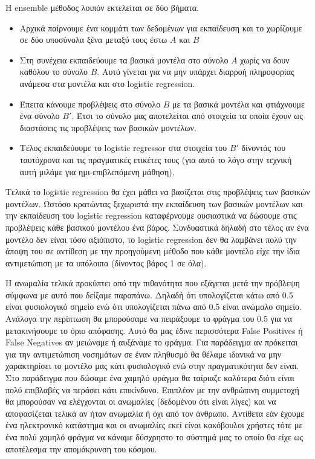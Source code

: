 \documentclass[a4paper,12pt]{report}
\theoremstyle{definitionNODot}
\begin{document}
	H ensemble μέθοδος λοιπόν εκτελείται σε δύο βήματα. 
	\begin{itemize}
		\item Αρχικά παίρνουμε ένα κομμάτι των δεδομένων για εκπαίδευση και το χωρίζουμε σε δύο υποσύνολα ξένα μεταξύ τους έστω $A$ και $B$
		\item Στη συνέχεια εκπαιδεύουμε τα βασικά μοντέλα στο σύνολο $A$ χωρίς να δουν καθόλου το σύνολο $B$. Αυτό γίνεται για να μην υπάρχει διαρροή πληροφορίας ανάμεσα στα μοντέλα και στο logistic regression.
		\item Έπειτα κάνουμε προβλέψεις στο σύνολο $B$ με τα βασικά μοντέλα και φτιάχνουμε ένα σύνολο $B'$. Έτσι το σύνολο μας αποτελείται από στοιχεία τα οποία έχουν ως διαστάσεις τις προβλέψεις των βασικών μοντέλων.
		\item Τέλος εκπαιδεύουμε το logistic regressor στα στοιχεία του $B'$ δίνοντάς του ταυτόχρονα και τις πραγματικές ετικέτες τους (για αυτό το λόγο στην τεχνική αυτή μιλάμε για ημι-επιβλεπόμενη μάθηση).
	\end{itemize}
	Τελικά το logistic regression θα έχει μάθει να βασίζεται στις προβλέψεις των βασικών μοντέλων. Ωστόσο κρατώντας ξεχωριστά την εκπαίδευση των βασικών μοντέλων και την εκπαίδευση του logistic regression καταφέρνουμε ουσιαστικά να δώσουμε στις προβλέψεις κάθε βασικού μοντέλου ένα βάρος. Συνδυαστικά δηλαδή στο τέλος αν ένα μοντέλο δεν είναι τόσο αξιόπιστο, το logistic regression δεν θα λαμβάνει πολύ την άποψη του σε αντίθεση με την προηγούμενη μέθοδο που κάθε μοντέλο είχε την ίδια αντιμετώπιση με τα υπόλοιπα (δίνοντας βάρος 1 σε όλα).
	
	Η ανωμαλία τελικά προκύπτει από την πιθανότητα που εξάγεται μετά την πρόβλεψη σύμφωνα με αυτό που δείξαμε παραπάνω. Δηλαδή ότι υπολογίζεται κάτω από 0.5 είναι φυσιολογικό σημείο ενώ ότι υπολογίζεται πάνω από 0.5 είναι ανώμαλο σημείο. Ανάλογα την περίπτωση θα μπορούσαμε να πειράξουμε το φράγμα του 0.5 για να μετακινήσουμε το όριο απόφασης. Αυτό θα μας έδινε περισσότερα False Positives ή False Negatives αν μειώναμε ή αυξάναμε το φράγμα. Για παράδειγμα αν πρόκειται για την αντιμετώπιση νοσημάτων σε έναν πληθυσμό θα θέλαμε ιδανικά να μην χαρακτηρίσει το μοντέλο μας κάτι φυσιολογικό ενώ στην πραγματικότητα δεν είναι. Στο παράδειγμα που δώσαμε ένα χαμηλό φράγμα θα ταίριαζε καλύτερα διότι είναι πολύ επιβλαβές να περάσει κάτι επικίνδυνο. Επιπλέον με την ανθρώπινη συμμετοχή θα μπορούσαν να ελέγχονται οι ανωμαλίες (δεδομένου ότι είναι λίγες) και να αποφασίζεται τελικά αν ήταν ανωμαλία ή όχι από τον άνθρωπο. Αντίθετα εάν έχουμε ένα ηλεκτρονικό κατάστημα και οι ανωμαλίες εκεί είναι κακόβουλοι χρήστες τότε με ένα πολύ χαμηλό φράγμα να κάναμε δύσχρηστο το σύστημά μας το οποίο θα είχε ως αποτέλεσμα την απομάκρυνση του κόσμου.
	
\end{document}

